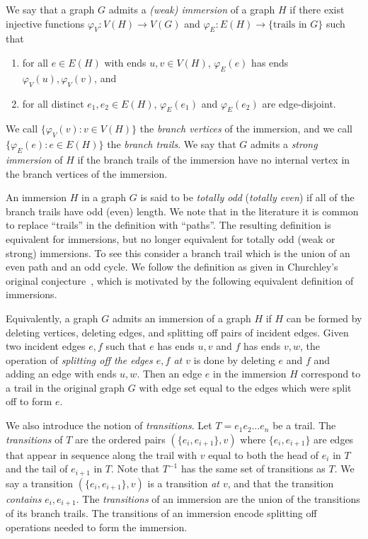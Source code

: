\documentclass{article}
\theoremstyle{definition}
\begin{document}
We say that a graph $G$ admits a \emph{(weak) immersion} of a graph $H$ if there exist injective functions $\varphi_V: V(H) \rightarrow V(G)$ and $\varphi_E: E(H) \rightarrow \{\text{trails in }G\}$ such that 
\begin{enumerate}
    \item for all $e \in E(H)$ with ends $u,v \in V(H)$, $\varphi_E(e)$ has ends $\varphi_V(u), \varphi_V(v)$, and
    \item for all distinct $e_1, e_2 \in E(H)$, $\varphi_E(e_1)$ and $\varphi_E(e_2)$ are edge-disjoint.
\end{enumerate}
We call $\{\varphi_V(v) : v \in V(H)\}$ the \emph{branch vertices} of the immersion, and we call $\{\varphi_E(e) : e \in E(H)\}$ the \emph{branch trails}. We say that $G$ admits a \emph{strong immersion} of $H$ if the branch trails of the immersion have no internal vertex in the branch vertices of the immersion.

An immersion $H$ in a graph $G$ is said to be \emph{totally odd} (\emph{totally even}) if all of the branch trails have odd (even) length. We note that in the literature it is common to replace ``trails'' in the definition with ``paths''. The resulting definition is equivalent for immersions, but no longer equivalent for totally odd (weak or strong) immersions. To see this consider a branch trail which is the union of an even path and an odd cycle. We follow the definition as given in Churchley's original conjecture~\cite{Churchley2017Odd}, which is motivated by the following equivalent definition of immersions.

Equivalently, a graph $G$ admits an immersion of a graph $H$ if $H$ can be formed by deleting vertices, deleting edges, and splitting off pairs of incident edges. Given two incident edges $e,f$ such that $e$ has ends $u,v$ and $f$ has ends $v,w$, the operation of \emph{splitting off the edges $e,f$ at $v$} is done by deleting $e$ and $f$ and adding an edge with ends $u,w$. Then an edge $e$ in the immersion $H$ correspond to a trail in the original graph $G$ with edge set equal to the edges which were split off to form $e$.

We also introduce the notion of \emph{transitions}. Let $T = e_1e_2\dots e_n$ be a trail. The \emph{transitions} of $T$ are the ordered pairs $(\{e_i, e_{i+1}\}, v)$ where $\{e_i, e_{i+1}\}$ are edges that appear in sequence along the trail with $v$ equal to both the head of $e_i$ in $T$ and the tail of $e_{i+1}$ in $T$. Note that $T^{-1}$ has the same set of transitions as $T$. We say a transition $(\{e_i, e_{i+1}\}, v)$ is a transition \emph{at $v$}, and that the transition \emph{contains} $e_i, e_{i+1}$. The \emph{transitions} of an immersion are the union of the transitions of its branch trails. The transitions of an immersion encode splitting off operations needed to form the immersion.
\end{document}
